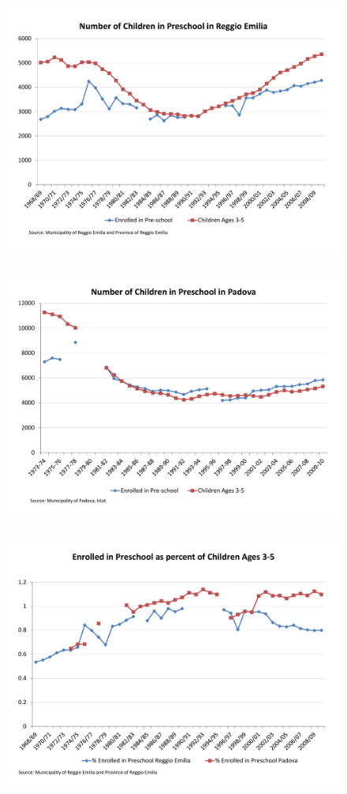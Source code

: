 

\begin{figure}
	\includegraphics[scale=0.8]{../../output/image/Enrollement_Preschool_RE.pdf}
\end{figure}



\begin{figure}
	\includegraphics[scale=0.8]{../../output/image/Enrollement_Preschool_Padova.pdf}
\end{figure}


\begin{figure}
	\includegraphics[scale=0.8]{../../output/image/Enrollement_Preschool_age3-5.pdf}
\end{figure}